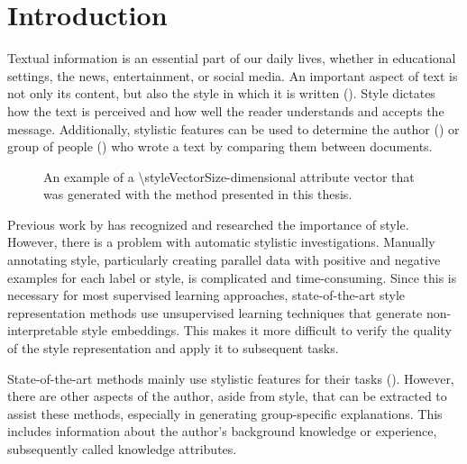 \chapter{Introduction}
\label{sec:introduction}
Textual information is an essential part of our daily lives, whether in educational settings, the news, entertainment, or social media. An important aspect of text is not only its content, but also the style in which it is written (\cite{wegmannSameAuthorJust2022}). Style dictates how the text is perceived and how well the reader understands and accepts the message. Additionally, stylistic features can be used to determine the author (\cite{alshomaryLatentSpaceInterpretation2024}) or group of people (\cite{10.1007/978-3-642-29047-3_27}) who wrote a text by comparing them between documents.

\begin{figure}[ht]
  \begin{center}
    
    \caption{An example of a \num{\styleVectorSize}-dimensional attribute vector that was generated with the method presented in this thesis.} %
  \end{center}
\end{figure}

Previous work by \citet{zhu-etal-2024-styleflow, ijcai2020p526,wegmannSameAuthorJust2022} has recognized and researched the importance of style. However, there is a problem with automatic stylistic investigations. Manually annotating style, particularly creating parallel data with positive and negative examples for each label or style, is complicated and time-consuming. Since this is necessary for most supervised learning approaches, state-of-the-art style representation methods use unsupervised learning techniques that generate non-interpretable style embeddings. This makes it more difficult to verify the quality of the style representation and apply it to subsequent tasks.


State-of-the-art methods mainly use stylistic features for their tasks (\cite{alshomaryLatentSpaceInterpretation2024,patelLearningInterpretableStyle2023,konenStyleVectorsSteering2024,zhu-etal-2024-styleflow}). However, there are other aspects of the author, aside from style, that can be extracted to assist these methods, especially in generating group-specific explanations. This includes information about the author's background knowledge or experience, subsequently called knowledge attributes.

